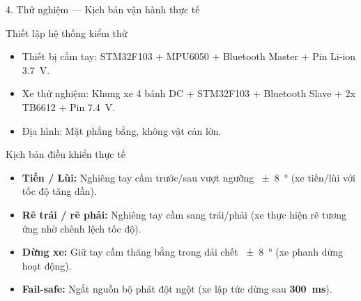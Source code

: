 \documentclass[aspectratio=169, 10pt]{beamer}
\begin{document}
\begin{frame}{4. Thử nghiệm — Kịch bản vận hành thực tế}
  \begin{block}{Thiết lập hệ thống kiểm thử}
    \begin{itemize}
      \item Thiết bị cầm tay: STM32F103 + MPU6050 + Bluetooth Master + Pin Li-ion \qty{3.7}{\volt}.
      \item Xe thử nghiệm: Khung xe 4 bánh DC + STM32F103 + Bluetooth Slave + 2x TB6612 + Pin \qty{7.4}{\volt}.
      \item Địa hình: Mặt phẳng bằng, không vật cản lớn.
    \end{itemize}
  \end{block}
  \begin{block}{Kịch bản điều khiển thực tế}
    \begin{itemize}
      \item \textbf{Tiến / Lùi:} Nghiêng tay cầm trước/sau vượt ngưỡng \qty{\pm 8}{\degree} (xe tiến/lùi với tốc độ tăng dần).
      \item \textbf{Rẽ trái / rẽ phải:} Nghiêng tay cầm sang trái/phải (xe thực hiện rẽ tương ứng nhờ chênh lệch tốc độ).
      \item \textbf{Dừng xe:} Giữ tay cầm thăng bằng trong dải chết \qty{\pm 8}{\degree} (xe phanh dừng hoạt động).
      \item \textbf{Fail-safe:} Ngắt nguồn bộ phát đột ngột (xe lập tức dừng sau \textbf{\qty{300}{\ms}}).
    \end{itemize}
  \end{block}
\end{frame}
\end{document}
